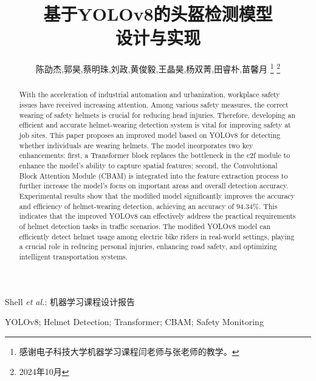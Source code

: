 \documentclass[journal]{IEEEtran}
\numberwithin{figure}{section}%
\begin{document}
\title{基于YOLOv8的头盔检测模型\\设计与实现}

\author{陈劭杰,郭昊,蔡明珠,刘政,黄俊毅,王晶昊,杨双菁,田睿朴,苗馨月%
\thanks{感谢电子科技大学机器学习课程闫老师与张老师的教学。}%
\thanks{2024年10月}}


%
{Shell \MakeLowercase{\textit{et al.}}: 机器学习课程设计报告}


\maketitle

\begin{abstract}
	With the acceleration of industrial automation and urbanization, workplace safety issues have received increasing attention. Among various safety measures, the correct wearing of safety helmets is crucial for reducing head injuries. Therefore, developing an efficient and accurate helmet-wearing detection system is vital for improving safety at job sites. This paper proposes an improved model based on YOLOv8 for detecting whether individuals are wearing helmets. The model incorporates two key enhancements: first, a Transformer block replaces the bottleneck in the c2f module to enhance the model's ability to capture spatial features; second, the Convolutional Block Attention Module (CBAM) is integrated into the feature extraction process to further increase the model's focus on important areas and overall detection accuracy. Experimental results show that the modified model significantly improves the accuracy and efficiency of helmet-wearing detection, achieving an accuracy of 94.34\%. This indicates that the improved YOLOv8 can effectively address the practical requirements of helmet detection tasks in traffic scenarios. The modified YOLOv8 model can efficiently detect helmet usage among electric bike riders in real-world settings, playing a crucial role in reducing personal injuries, enhancing road safety, and optimizing intelligent transportation systems.
\end{abstract}

\begin{IEEEkeywords}
YOLOv8; Helmet Detection; Transformer; CBAM; Safety Monitoring
\end{IEEEkeywords}
\end{document}
